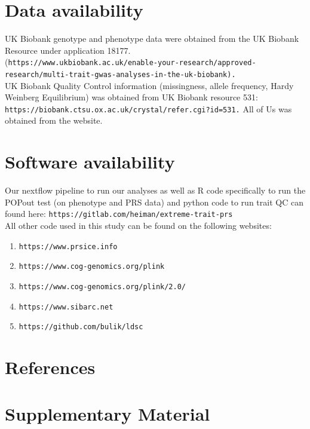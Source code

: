 \documentclass[12pt]{zHenriquesLab-StyleBioRxiv}
\begin{document}
\clearpage \newpage


\section*{Data availability} 
UK Biobank genotype and phenotype data were obtained from the UK Biobank Resource under application 18177. \\
{(\tt https://www.ukbiobank.ac.uk/enable-your-research/approved-research/multi-trait-gwas-analyses-in-the-uk-biobank).}\\  

UK Biobank Quality Control information (missingness, allele frequency, Hardy Weinberg Equilibrium) was obtained from UK Biobank
resource 531: {\tt https://biobank.ctsu.ox.ac.uk/crystal/refer.cgi?id=531.}  
All of Us was obtained from the website. 




\section*{Software availability}
{\small Our nextflow pipeline to run our analyses as well as R code specifically to run the POPout test (on phenotype and PRS data) 
and python code to run trait QC can found here: {\tt https://gitlab.com/heiman/extreme-trait-prs} \\ 
All other code used in this study can be found on the following websites:}
{\small
\vspace*{-2mm}
\begin{enumerate}\centering
\item[PRSice-2:]{\tt https://www.prsice.info}
\item[PLINK 1.9:]{\tt https://www.cog-genomics.org/plink}
\item[PLINK 2.0:]{\tt https://www.cog-genomics.org/plink/2.0/}
\item[sibArc:]{\tt https://www.sibarc.net}
\item[LD score reg:]{\tt https://github.com/bulik/ldsc}
\end{enumerate}}




\section*{References} \label{sec:references} 

\clearpage \newpage


\section*{Supplementary Material} \label{sec:supplement}
\end{document}
